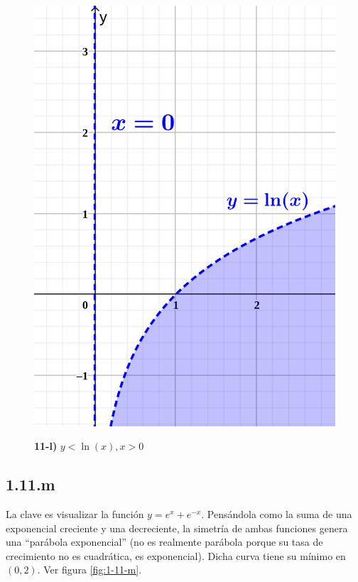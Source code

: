 \documentclass{article}
\begin{document}
\begin{figure}[ht]
\caption{\textbf{11-l)} $y < \ln(x), x > 0$}
\includegraphics[scale=0.75]{../img/exercises/guide_01/11_l.png} 
\centering
\label{fig:1-11-l}
\end{figure}

\subsection*{1.11.m}
\label{subsec:1.11.m}

La clave es visualizar la función $y = e^x + e^{-x}$. Pensándola como la suma de una exponencial creciente y una decreciente, la simetría de ambas funciones genera una ``parábola exponencial'' (no es realmente parábola porque su tasa de crecimiento no es cuadrática, es exponencial). Dicha curva tiene su mínimo en $(0, 2)$. Ver figura \ref{fig:1-11-m}.
\end{document}
